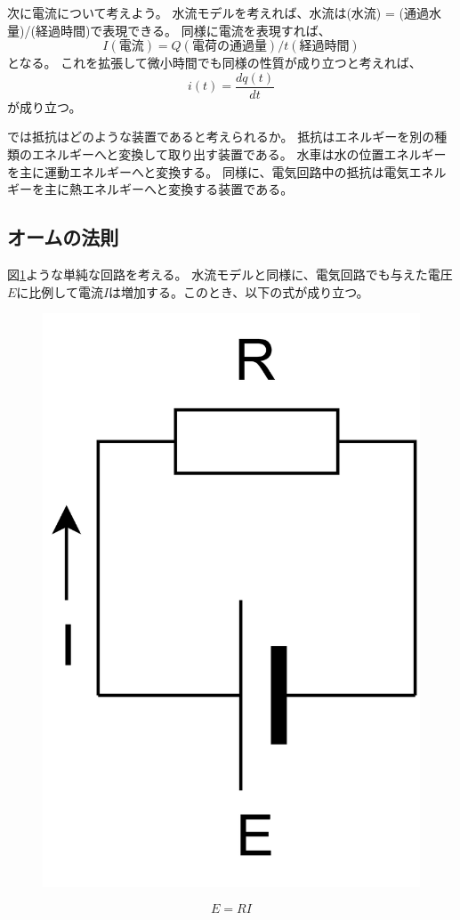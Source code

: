 \documentclass{ltjsreport}
\begin{document}
次に電流について考えよう。
水流モデルを考えれば、水流は(水流) = (通過水量)/(経過時間)で表現できる。
同様に電流を表現すれば、
\[  
  I(電流) = Q(電荷の通過量)/t(経過時間)
  \]
となる。
これを拡張して微小時間でも同様の性質が成り立つと考えれば、
\[
  i(t) = \frac{dq(t)}{dt}
\]
が成り立つ。

では抵抗はどのような装置であると考えられるか。
抵抗はエネルギーを別の種類のエネルギーへと変換して取り出す装置である。
水車は水の位置エネルギーを主に運動エネルギーへと変換する。
同様に、電気回路中の抵抗は電気エネルギーを主に熱エネルギーへと変換する装置である。

\subsection{オームの法則}
図\ref{fig:ohm}ような単純な回路を考える。
水流モデルと同様に、電気回路でも与えた電圧$E$に比例して電流$I$は増加する。このとき、以下の式が成り立つ。

\begin{figure}[bt]
  \centering
  \includegraphics[keepaspectratio, scale=0.07]
       {img/ohm.drawio.png}
  \caption{}
  \label{fig:ohm}
 \end{figure}
\begin{equation}
  E = RI
\end{equation}
\end{document}
